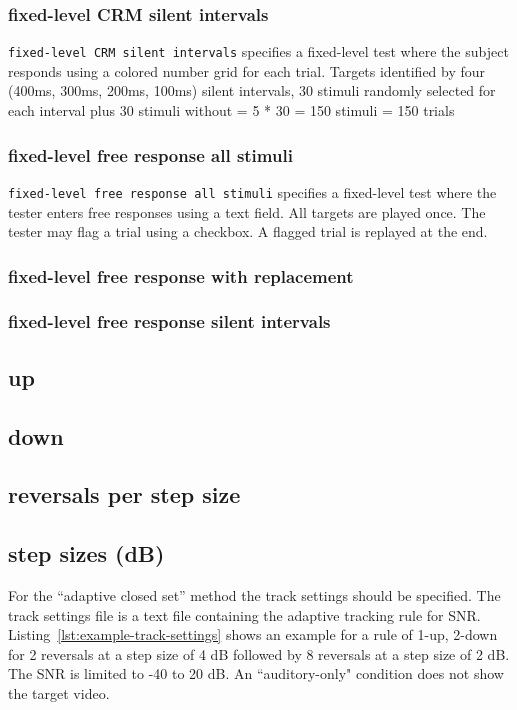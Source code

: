 \documentclass[11pt,pdftex,letterpaper]{article}
\begin{document}
\subsubsection{fixed-level CRM silent intervals}
\texttt{fixed-level CRM silent intervals} specifies a fixed-level test where the subject responds using a colored number grid for each trial. Targets identified by four (400ms, 300ms, 200ms, 100ms) silent intervals, 30 stimuli randomly selected for each interval plus 30 stimuli without = 5 * 30 = 150 stimuli = 150 trials
\subsubsection{fixed-level free response all stimuli}
\texttt{fixed-level free response all stimuli} specifies a fixed-level test where the tester enters free responses using a text field. All targets are played once. The tester may flag a trial using a checkbox. A flagged trial is replayed at the end.
\subsubsection{fixed-level free response with replacement}
\subsubsection{fixed-level free response silent intervals}
\subsection{up}
\subsection{down}
\subsection{reversals per step size}
\subsection{step sizes (dB)}
For the ``adaptive closed set'' method the track settings should be specified. The track settings file is a text file containing the adaptive tracking rule for SNR. Listing~\ref{lst:example-track-settings} shows an example for a rule of 1-up, 2-down for 2 reversals at a step size of 4 dB followed by 8 reversals at a step size of 2 dB. The SNR is limited to -40 to 20 dB. An ``auditory-only" condition does not show the target video.
\end{document}
